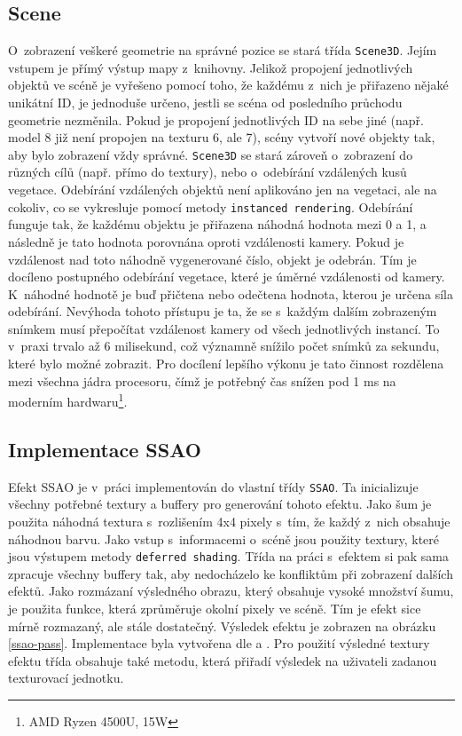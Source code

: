 \subsection*{Scene}
O~zobrazení veškeré geometrie na správné pozice se stará třída \verb|Scene3D|. Jejím vstupem je přímý výstup mapy z~knihovny. Jelikož propojení jednotlivých objektů ve scéně je vyřešeno pomocí toho, že každému z~nich je přiřazeno nějaké unikátní ID, je jednoduše určeno, jestli se scéna od posledního průchodu geometrie nezměnila. Pokud je propojení jednotlivých ID na sebe jiné (např. model 8 již není propojen na texturu 6, ale 7), scény vytvoří nové objekty tak, aby bylo zobrazení vždy správné. \verb|Scene3D| se stará zároveň o~zobrazení do různých cílů (např. přímo do textury), nebo o~odebírání vzdálených kusů vegetace. Odebírání vzdálených objektů není aplikováno jen na vegetaci, ale na cokoliv, co se vykresluje pomocí metody \verb|instanced rendering|. Odebírání funguje tak, že každému objektu je přiřazena náhodná hodnota mezi 0 a 1, a následně je tato hodnota porovnána oproti vzdálenosti kamery. Pokud je vzdálenost nad toto náhodně vygenerované číslo, objekt je odebrán. Tím je docíleno postupného odebírání vegetace, které je úměrné vzdálenosti od kamery. K~náhodné hodnotě je buď přičtena nebo odečtena hodnota, kterou je určena síla odebírání. Nevýhoda tohoto přístupu je ta, že se s~každým dalším zobrazeným snímkem musí přepočítat vzdálenost kamery od všech jednotlivých instancí. To v~praxi trvalo až 6 milisekund, což významně snížilo počet snímků za sekundu, které bylo možné zobrazit. Pro docílení lepšího výkonu je tato činnost rozdělena mezi všechna jádra procesoru, čímž je potřebný čas snížen pod 1 ms na moderním hardwaru\footnote{AMD Ryzen 4500U, 15W}.

\subsection*{Implementace SSAO}
Efekt SSAO je v~práci implementován do vlastní třídy \verb|SSAO|. Ta inicializuje všechny potřebné textury a buffery pro generování tohoto efektu. Jako šum je použita náhodná textura s~rozlišením 4x4 pixely s~tím, že každý z~nich obsahuje náhodnou barvu. Jako vstup s~informacemi o~scéně jsou použity textury, které jsou výstupem metody \verb|deferred shading|. Třída na práci s~efektem si pak sama zpracuje všechny buffery tak, aby nedocházelo ke konfliktům při zobrazení dalších efektů. Jako rozmázaní výsledného obrazu, který obsahuje vysoké množství šumu, je použita funkce, která zprůměruje okolní pixely ve scéně. Tím je efekt sice mírně rozmazaný, ale stále dostatečný. Výsledek efektu je zobrazen na obrázku \ref{ssao-pass}. Implementace byla vytvořena dle \cite{learnogl} a \cite{ogldev}. Pro použití výsledné textury efektu třída obsahuje také metodu, která přiřadí výsledek na uživateli zadanou texturovací jednotku.

